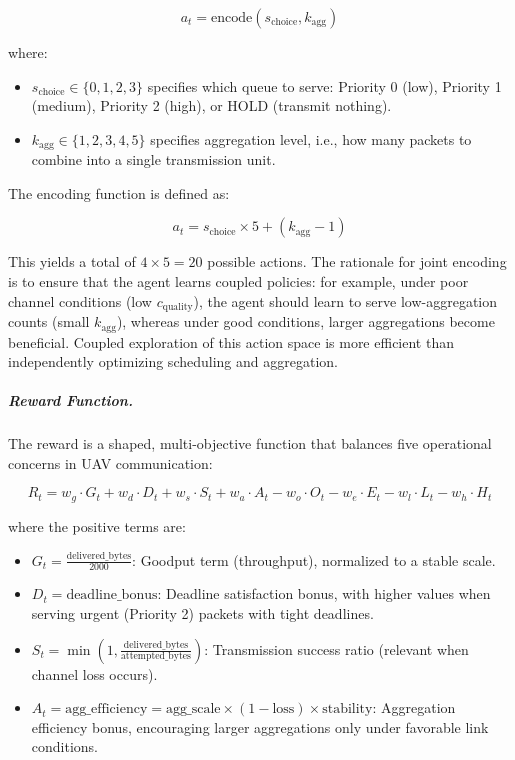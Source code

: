 \documentclass[pdflatex,sn-mathphys-num]{sn-jnl}%
\theoremstyle{thmstyleone}%
\theoremstyle{thmstyletwo}%
\theoremstyle{thmstylethree}%
\begin{document}
\begin{equation}
a_t = \text{encode}(s_\text{choice}, k_\text{agg})
\label{eq:action_combined}
\end{equation}

where:
\begin{itemize}
    \item $s_\text{choice} \in \{0, 1, 2, 3\}$ specifies which queue to serve: Priority 0 (low), Priority 1 (medium), Priority 2 (high), or HOLD (transmit nothing).
    \item $k_\text{agg} \in \{1, 2, 3, 4, 5\}$ specifies aggregation level, i.e., how many packets to combine into a single transmission unit.
\end{itemize}

The encoding function is defined as:

\begin{equation}
a_t = s_\text{choice} \times 5 + (k_\text{agg} - 1)
\label{eq:action_encode}
\end{equation}

This yields a total of $4 \times 5 = 20$ possible actions. The rationale for joint encoding is to ensure that the agent learns coupled policies: for example, under poor channel conditions (low $c_\text{quality}$), the agent should learn to serve low-aggregation counts (small $k_\text{agg}$), whereas under good conditions, larger aggregations become beneficial. Coupled exploration of this action space is more efficient than independently optimizing scheduling and aggregation.

\subparagraph{Reward Function.}
The reward is a shaped, multi-objective function that balances five operational concerns in UAV communication:

\begin{equation}
R_t = w_g \cdot G_t + w_d \cdot D_t + w_s \cdot S_t + w_a \cdot A_t - w_o \cdot O_t - w_e \cdot E_t - w_l \cdot L_t - w_h \cdot H_t
\label{eq:reward_shaped}
\end{equation}

where the positive terms are:

\begin{itemize}
    \item $G_t = \frac{\text{delivered\_bytes}}{2000}$: Goodput term (throughput), normalized to a stable scale.
    \item $D_t = \text{deadline\_bonus}$: Deadline satisfaction bonus, with higher values when serving urgent (Priority 2) packets with tight deadlines.
    \item $S_t = \min\left(1, \frac{\text{delivered\_bytes}}{\text{attempted\_bytes}}\right)$: Transmission success ratio (relevant when channel loss occurs).
    \item $A_t = \text{agg\_efficiency} = \text{agg\_scale} \times (1 - \text{loss}) \times \text{stability}$: Aggregation efficiency bonus, encouraging larger aggregations only under favorable link conditions.
\end{itemize}
\end{document}
